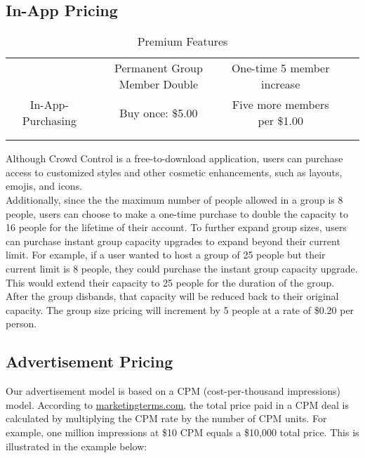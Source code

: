 \subsection{In-App Pricing}




\begin {table}[H]
\caption {Premium Features} \label{tab:title} 
\begin{center}
\label{premium-features}
\begin{tabular}{lllll}
\cline{1-3}
\multicolumn{1}{|c|}{} & \multicolumn{1}{c|}{Permanent Group Member Double} & \multicolumn{1}{c|}{One-time 5 member increase} & \\ \cline{1-3}
\multicolumn{1}{|c|}{In-App-Purchasing} & \multicolumn{1}{c|}{Buy once: \$5.00} & \multicolumn{1}{c|}{Five more members per \$1.00} &  \\ \cline{1-3}
                       &                       &                       &                       &  \\
                       &                       &                       &                       & 
\end{tabular}
\end{center}
\end{table}




Although Crowd Control is a free-to-download application, users can purchase access to customized styles and other cosmetic enhancements, such as layouts, emojis, and icons. \\

Additionally, since the the maximum number of people allowed in a group is 8 people, users can choose to make a one-time purchase to double the capacity to 16 people for the lifetime of their account. To further expand group sizes, users can purchase instant group capacity upgrades to expand beyond their current limit. For example, if a user wanted to host a group of 25 people but their current limit is 8 people, they could purchase the instant group capacity upgrade. This would extend their capacity to 25 people for the duration of the group. After the group disbands, that capacity will be reduced back to their original capacity. The group size pricing will increment by 5 people at a rate of \$0.20 per person.

\subsection{Advertisement Pricing}
Our advertisement model is based on a CPM (cost-per-thousand impressions) model. According to \url{marketingterms.com}, the total price paid in a CPM deal is calculated by multiplying the CPM rate by the number of CPM units. For example, one million impressions at \$10 CPM equals a \$10,000 total price. This is illustrated in the example below:

